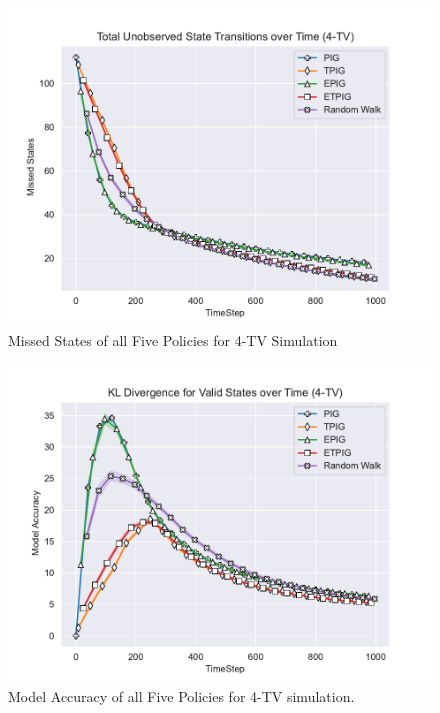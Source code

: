 \documentclass[12pt]{thesis}
\begin{document}
\begin{figure}[p]
	\begin{center}
		\includegraphics[scale=0.8]{"images/Missed_States_4-TV.pdf"}
	\end{center}
	\caption{Missed States of all Five Policies for 4-TV Simulation}
	\label{Fig:MSFP4TV}
\end{figure}
\begin{figure}
	\begin{center}
		\includegraphics[scale=0.8]{"images/Model_Accuracy_4-TV.pdf"}
	\end{center}
	\caption{Model Accuracy of all Five Policies for 4-TV simulation.}
	\label{Fig:MAFP4TV}
\end{figure}
\end{document}
